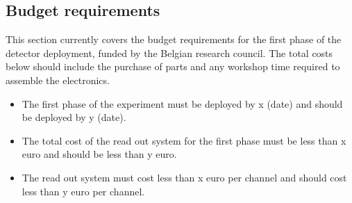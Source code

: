 \documentclass[a4paper]{article}
\begin{document}
\subsection{Budget requirements}

This section currently covers the budget requirements for the first phase of the detector deployment, funded by the Belgian research council. 
The total costs below should include the purchase of parts and any workshop time required to assemble the electronics.
\begin{itemize}
\item The first phase of the experiment must be deployed by x (date) and should be deployed by y (date). 
\item The total cost of the read out system for the first phase must be less than x euro and should be less than y euro.
\item The read out system must cost less than x euro per channel and should cost less than y euro per channel.
\end{itemize}
\end{document}
